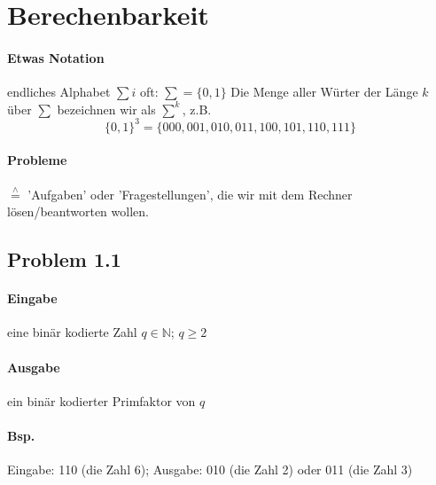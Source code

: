 \section{Berechenbarkeit}


\paragraph*{Etwas Notation} endliches Alphabet $\sum i$ oft: $\sum = \{ 0,1 \}$ Die Menge aller Würter der Länge $k$ über $\sum$ bezeichnen wir als $\sum\limits^k$, z.B.  $$ \{ 0,1 \}^3 = \{ 000,001,010,011,100,101,110,111 \} $$

\paragraph*{Probleme} $\overset{\wedge}{=}$ 'Aufgaben' oder 'Fragestellungen', die wir mit dem Rechner lösen/beantworten wollen.


\subsection*{Problem 1.1}
\paragraph*{Eingabe} eine binär kodierte Zahl $q \in \mathbb{N}$; $q \geq 2$

\paragraph*{Ausgabe} ein binär kodierter Primfaktor von $q$

\paragraph*{Bsp.} Eingabe: 110 (die Zahl 6); Ausgabe: 010 (die Zahl 2) oder 011 (die Zahl 3)



